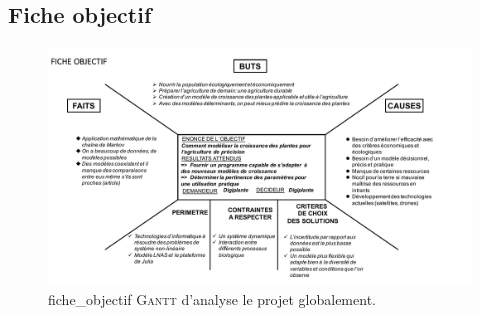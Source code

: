 \subsection{Fiche objectif}
\begin{figure}[h]
  \includegraphics[scale=0.51]{./annexes/fiche_objectif.pdf}
  \caption{fiche_objectif \textsc{Gantt} d'analyse le projet globalement.}
  \label{fig:fiche_objectif}
\end{figure}